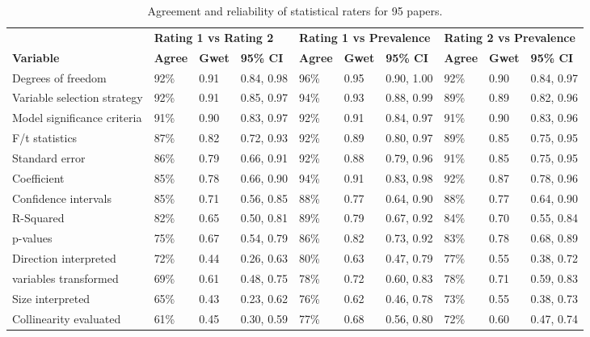 \begin{table}[H]
\begin{widestuff}
\caption{ Agreement and reliability of statistical raters for 95 papers.} 
\begin{flushleft}  \begin{tabular}{llllllllll}
  \toprule & \multicolumn{3}{l}{\textbf{Rating 1 vs Rating 2}} & \multicolumn{3}{l}{\textbf{Rating 1 vs Prevalence}} & \multicolumn{3}{l}{\textbf{Rating 2 vs Prevalence}} \\
\cline{2-10}
{\bf Variable} & {\bf Agree} & {\bf Gwet} & {\bf 95\% CI} & {\bf Agree} & {\bf Gwet} & {\bf 95\% CI} & {\bf Agree} & {\bf Gwet} & {\bf 95\% CI} \\ 
  \midrule
Degrees of freedom & 92\% & 0.91 & 0.84, 0.98 & 96\% & 0.95 & 0.90, 1.00 & 92\% & 0.90 & 0.84, 0.97 \\ 
  Variable selection strategy & 92\% & 0.91 & 0.85, 0.97 & 94\% & 0.93 & 0.88, 0.99 & 89\% & 0.89 & 0.82, 0.96 \\ 
  Model significance criteria & 91\% & 0.90 & 0.83, 0.97 & 92\% & 0.91 & 0.84, 0.97 & 91\% & 0.90 & 0.83, 0.96 \\ 
  F/t statistics & 87\% & 0.82 & 0.72, 0.93 & 92\% & 0.89 & 0.80, 0.97 & 89\% & 0.85 & 0.75, 0.95 \\ 
  Standard error & 86\% & 0.79 & 0.66, 0.91 & 92\% & 0.88 & 0.79, 0.96 & 91\% & 0.85 & 0.75, 0.95 \\ 
  Coefficient & 85\% & 0.78 & 0.66, 0.90 & 94\% & 0.91 & 0.83, 0.98 & 92\% & 0.87 & 0.78, 0.96 \\ 
  Confidence intervals & 85\% & 0.71 & 0.56, 0.85 & 88\% & 0.77 & 0.64, 0.90 & 88\% & 0.77 & 0.64, 0.90 \\ 
  R-Squared & 82\% & 0.65 & 0.50, 0.81 & 89\% & 0.79 & 0.67, 0.92 & 84\% & 0.70 & 0.55, 0.84 \\ 
  p-values & 75\% & 0.67 & 0.54, 0.79 & 86\% & 0.82 & 0.73, 0.92 & 83\% & 0.78 & 0.68, 0.89 \\ 
  Direction interpreted & 72\% & 0.44 & 0.26, 0.63 & 80\% & 0.63 & 0.47, 0.79 & 77\% & 0.55 & 0.38, 0.72 \\ 
  variables transformed & 69\% & 0.61 & 0.48, 0.75 & 78\% & 0.72 & 0.60, 0.83 & 78\% & 0.71 & 0.59, 0.83 \\ 
  Size interpreted & 65\% & 0.43 & 0.23, 0.62 & 76\% & 0.62 & 0.46, 0.78 & 73\% & 0.55 & 0.38, 0.73 \\ 
  Collinearity evaluated & 61\% & 0.45 & 0.30, 0.59 & 77\% & 0.68 & 0.56, 0.80 & 72\% & 0.60 & 0.47, 0.74 \\ 

\end{tabular}
\end{flushleft}
\end{widestuff}
\end{table}
